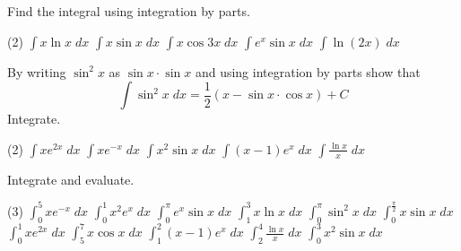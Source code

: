 \begin{Exercise}[title={Integration by Parts},label=exIBP]
	\Question Find the integral using integration by parts.
	\begin{tasks}(2)
		\task  $\int x \ln  x\; d x$ %
		\task $\int x \sin  x\; d x$ %
		\task $\int x \cos  3 x\; d x$ %
		\task $\int e^{x} \sin  x\; d x$ %
		\task $\int \ln  \left (2 x\right )\; d x$ %
	\end{tasks}
	
	\Question By writing $\sin ^{2} x$ as $\sin  x \cdot \sin  x$ and using integration by parts show that
	\begin{equation*}\int \sin ^{2} x\; d x =\frac{1}{2} \left (x -\sin  x \cdot \cos  x\right ) +C
	\end{equation*} %
\clearpage
	\Question Integrate.
	\begin{tasks}(2)
		\task  $\int x e^{2 x}\; d x$ %
		\task $\int x e^{ -x}\; d x$ %
		\task $\int x^{2} \sin  x\; d x$ %
		\task $\int \left (x -1\right ) e^{x}\; d x$ %
		\task $\int \frac{\ln  x}{x}\; d x$%
	\end{tasks}

	\Question Integrate and evaluate.
	\begin{tasks}(3)
		\task $\int _{0}^{5}x e^{ -x}\; d x$ 		%
		\task $\int _{0}^{1}x^{2} e^{x}\; d x$ %
		\task $\int _{0}^{\pi }e^{x} \sin  x\; d x$ %
		\task $\int _{1}^{3}x \ln  x\; d x$ %
		\task $\int _{0}^{\pi }\sin ^{2} x\; d x$%
		\task $\int _{0}^{\frac{\pi }{2}}x \sin  x\; d x$ %
		\task $\int _{0}^{1}x e^{2 x}\; d x$ %
		\task $\int _{5}^{7}x \cos  x\; d x$ %
		\task $\int _{1}^{2}\left (x -1\right ) e^{x}\; d x$ %
		\task $\int _{2}^{4}\frac{\ln  x}{x}\; d x$ %
		\task $\int _{0}^{3}x^{2} \sin  x\; d x$ %
	\end{tasks}
\end{Exercise}
